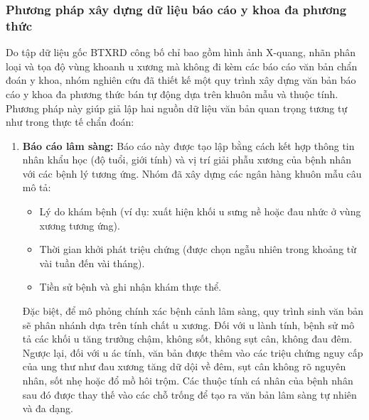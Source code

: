 \subsubsection{Phương pháp xây dựng dữ liệu báo cáo y khoa đa phương thức}
Do tập dữ liệu gốc BTXRD công bố chỉ bao gồm hình ảnh X-quang, nhãn phân loại và tọa độ vùng khoanh u xương mà không đi kèm các báo cáo văn bản chẩn đoán y khoa, nhóm nghiên cứu đã thiết kế một quy trình xây dựng văn bản báo cáo y khoa đa phương thức bán tự động dựa trên khuôn mẫu và thuộc tính. Phương pháp này giúp giả lập hai nguồn dữ liệu văn bản quan trọng tương tự như trong thực tế chẩn đoán:

\begin{enumerate}
    \item \textbf{Báo cáo lâm sàng:}
    Báo cáo này được tạo lập bằng cách kết hợp thông tin nhân khẩu học (độ tuổi, giới tính) và vị trí giải phẫu xương của bệnh nhân với các bệnh lý tương ứng. Nhóm đã xây dựng các ngân hàng khuôn mẫu câu mô tả:
    \begin{itemize}
        \item Lý do khám bệnh (ví dụ: xuất hiện khối u sưng nề hoặc đau nhức ở vùng xương tương ứng).
        \item Thời gian khởi phát triệu chứng (được chọn ngẫu nhiên trong khoảng từ vài tuần đến vài tháng).
        \item Tiền sử bệnh và ghi nhận khám thực thể.
    \end{itemize}
    Đặc biệt, để mô phỏng chính xác bệnh cảnh lâm sàng, quy trình sinh văn bản sẽ phân nhánh dựa trên tính chất u xương. Đối với u lành tính, bệnh sử mô tả các khối u tăng trưởng chậm, không sốt, không sụt cân, không đau đêm. Ngược lại, đối với u ác tính, văn bản được thêm vào các triệu chứng nguy cấp của ung thư như đau xương tăng dữ dội về đêm, sụt cân không rõ nguyên nhân, sốt nhẹ hoặc đổ mồ hôi trộm. Các thuộc tính cá nhân của bệnh nhân sau đó được thay thế vào các chỗ trống để tạo ra văn bản lâm sàng tự nhiên và đa dạng.


\end{enumerate}
